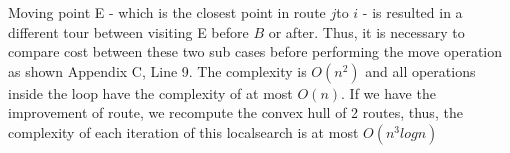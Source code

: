 \documentclass[12pt]{article}
\begin{document}
\begin{figure}[!ht]
	\centering
	\hfill
\end{figure}

Moving point E - which is the closest point in route \(j\)to \(i\) - is resulted in a different tour between visiting E before \(B\) or after. Thus, it is necessary to compare cost between these two sub cases before performing the move operation as shown Appendix C, Line 9. The complexity is $O(n^2)$ and all operations inside the loop have the complexity of at most $O(n)$. If we have the improvement of route, we recompute the convex hull of 2 routes, thus, the complexity of each iteration of this localsearch is at most $O(n^3logn)$
\end{document}
